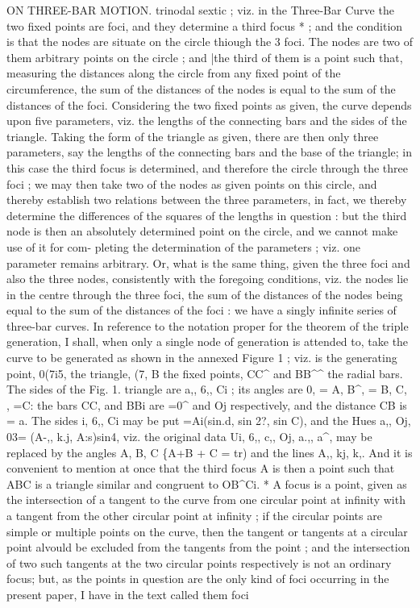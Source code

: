 \documentclass[12pt,a4paper]{article}
\begin{document}
ON THREE-BAR MOTION.
trinodal
sextic
;
viz.
in
the
Three-Bar
Curve
the
two
fixed
points
are
foci,
and
they
determine
a
third
focus *
;
and
the condition
is that the nodes
are situate on the
circle
thiough
the 3
foci.
The
nodes
are
two
of them arbitrary points on
the
circle
;
and |the
third
of them
is
a
point
such
that,
measuring
the
distances
along
the
circle
from
any
fixed
point
of
the
circumference,
the sum
of
the
distances
of
the
nodes
is
equal
to
the sum
of
the
distances
of
the
foci.
Considering
the
two
fixed
points
as
given,
the
curve
depends
upon
five
parameters,
viz. the
lengths
of
the
connecting
bars and the
sides of
the
triangle.
Taking
the form
of
the
triangle
as
given,
there
are
then
only
three
parameters,
say
the
lengths
of
the
connecting
bars
and
the
base
of
the
triangle;
in
this
case
the
third
focus
is
determined,
and
therefore
the
circle
through
the
three
foci
; we may
then
take two
of
the
nodes
as
given
points
on
this
circle, and thereby
establish
two
relations
between
the
three
parameters,
in
fact,
we
thereby
determine
the
differences
of the
squares
of
the
lengths
in
question
:
but
the
third
node
is then
an
absolutely determined
point
on
the
circle,
and we
cannot
make
use
of
it
for com-
pleting
the determination
of
the parameters
;
viz. one parameter remains
arbitrary.
Or,
what
is
the
same
thing,
given
the
three
foci
and
also
the
three
nodes,
consistently
with
the
foregoing
conditions,
viz. the
nodes
lie
in
the
centre
through
the
three
foci,
the sum
of
the
distances
of
the
nodes
being
equal
to
the sum
of
the
distances
of
the
foci
:
we have a
singly
infinite
series
of three-bar curves.
In
reference
to
the
notation
proper
for
the
theorem
of
the
triple
generation,
I
shall, when
only
a
single
node
of
generation
is
attended
to,
take
the
curve
to
be
generated
as
shown
in
the
annexed
Figure
1
;
viz.
is
the
generating
point,
0(7i5,
the
triangle,
(7, B
the
fixed
points,
CC\textasciicircum{}
and
BB\textasciicircum{}\textasciicircum{}
the
radial
bars.
The
sides
of the
Fig.
1.
triangle
are
a,,
6,,
Ci
;
its
angles
are
0, = A, B\textasciicircum{}, = B,
C,
, =C:
the
bars CC, and BBi
are
=0\textasciicircum{} and
Oj
respectively, and
the
distance CB
is = a.
The
sides
\guillemotleft{}i,
6,,
Ci may
be
put =Ai(sin.d,
sin 2?,
sin C), and the
Hues
a,,
Oj, 03= (A-,,
k.j,
A:s)sin4,
viz.
the
original
data
Ui,
6,,
c,,
Oj,
a.,,
a\textasciicircum{}, may
be
replaced
by the
angles
A, B, C \{A+B + C = tr) and
the
lines
A,,
kj,
k,.
And
it
is
convenient
to
mention
at
once
that
the
third
focus
A
is then a point such
that ABC
is a
triangle
similar and congruent
to OB\textasciicircum{}Ci.
* A focus
is a point, given as the
intersection
of a tangent to the curve from one circular point at
infinity
with a tangent from the
other circular point at
infinity
;
if the circular points
are simple or multiple points on
the
curve, then
the
tangent
or
tangents
at
a
circular
point
alvould
be excluded
from
the
tangents from
the
point
;
and
the
intersection
of two
such
tangents
at
the
two
circular points
respectively
is not
an
ordinary
focus;
but, as the
points
in
question
are
the
only kind
of
foci
occurring
in
the present paper,
I have in the
text called them foci
\end{document}
